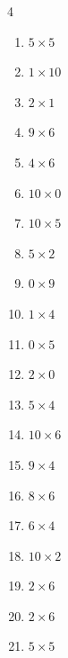 \begin{multicols}{4}
\begin{enumerate}
  \item $5\times 5$
        \phantom{$=25$}

  \item $1\times 10$
        \phantom{$=10$}

  \item $2\times 1$
        \phantom{$=2$}

  \item $9\times 6$
        \phantom{$=54$}

  \item $4\times 6$
        \phantom{$=24$}

  \item $10\times 0$
        \phantom{$=0$}

  \item $10\times 5$
        \phantom{$=50$}

  \item $5\times 2$
        \phantom{$=10$}

  \item $0\times 9$
        \phantom{$=0$}

  \item $1\times 4$
        \phantom{$=4$}

  \item $0\times 5$
        \phantom{$=0$}

  \item $2\times 0$
        \phantom{$=0$}

  \item $5\times 4$
        \phantom{$=20$}

  \item $10\times 6$
        \phantom{$=60$}

  \item $9\times 4$
        \phantom{$=36$}

\columnbreak %

  \item $8\times 6$
        \phantom{$=48$}

  \item $6\times 4$
        \phantom{$=24$}

  \item $10\times 2$
        \phantom{$=20$}

  \item $2\times 6$
        \phantom{$=12$}

  \item $2\times 6$
        \phantom{$=12$}

  \item $5\times 5$
        \phantom{$=25$}


\end{enumerate}
\end{multicols}
